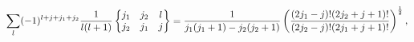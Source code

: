\[\sum_{l}(-1)^{l+j+j_{1}+j_{2}}\frac{1}{l(l+1)}\begin{Bmatrix}j_{1}&j_{2}&l\\
j_{2}&j_{1}&j\end{Bmatrix}=\frac{1}{j_{1}(j_{1}+1)-j_{2}(j_{2}+1)}\left(\frac{%
(2j_{1}-j)!(2j_{2}+j+1)!}{(2j_{2}-j)!(2j_{1}+j+1)!}\right)^{\frac{1}{2}},\]